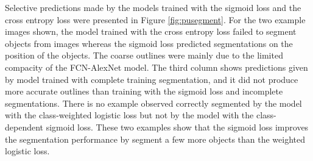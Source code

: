 Selective predictions made by the models trained with the sigmoid loss and the cross entropy loss were presented in Figure \ref{fig:pusegment}.
For the two example images shown, the model trained with the cross entropy loss failed to segment objects from images whereas the sigmoid loss predicted segmentations on the position of the objects.
The coarse outlines were mainly due to the limited compacity of the FCN-AlexNet model.
The third column shows predictions given by model trained with complete training segmentation, and it did not produce more accurate outlines than training with the sigmoid loss and incomplete segmentations.
There is no example observed correctly segmented by the model with the class-weighted logistic loss but not by the model with the class-dependent sigmoid loss.
These two examples show that the sigmoid loss improves the segmentation performance by segment a few more objects than the weighted logistic loss.

